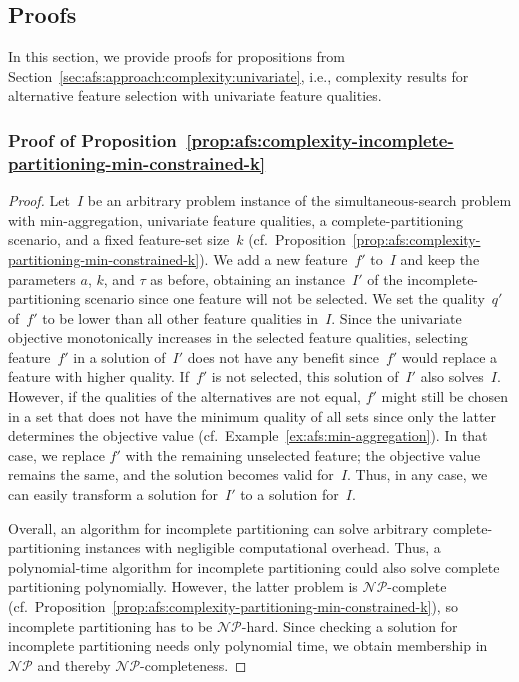 \subsection{Proofs}
\label{sec:appendix:afs:proofs}

In this section, we provide proofs for propositions from Section~\ref{sec:afs:approach:complexity:univariate}, i.e., complexity results for alternative feature selection with univariate feature qualities.

\subsubsection{Proof of Proposition~\ref{prop:afs:complexity-incomplete-partitioning-min-constrained-k}}
\label{sec:appendix:afs:proofs:complexity-incomplete-partitioning-min-constrained-k}

\begin{proof}
	Let~$I$ be an arbitrary problem instance of the simultaneous-search problem with min-aggregation, univariate feature qualities, a complete-partitioning scenario, and a fixed feature-set size~$k$ (cf.~Proposition~\ref{prop:afs:complexity-partitioning-min-constrained-k}).
	We add a new feature~$f'$ to~$I$ and keep the parameters $a$, $k$, and $\tau$ as before, obtaining an instance~$I'$ of the incomplete-partitioning scenario since one feature will not be selected.
	We set the quality~$q'$ of~$f'$ to be lower than all other feature qualities in~$I$.
	Since the univariate objective monotonically increases in the selected feature qualities, selecting feature~$f'$ in a solution of~$I'$ does not have any benefit since~$f'$ would replace a feature with higher quality.
	If~$f'$ is not selected, this solution of~$I'$ also solves~$I$.
	However, if the qualities of the alternatives are not equal, $f'$ might still be chosen in a set that does not have the minimum quality of all sets since only the latter determines the objective value (cf.~Example~\ref{ex:afs:min-aggregation}).
	In that case, we replace $f'$ with the remaining unselected feature; the objective value remains the same, and the solution becomes valid for~$I$.
	Thus, in any case, we can easily transform a solution for~$I'$ to a solution for~$I$.
	
	Overall, an algorithm for incomplete partitioning can solve arbitrary complete-partitioning instances with negligible computational overhead.
	Thus, a polynomial-time algorithm for incomplete partitioning could also solve complete partitioning polynomially.
	However, the latter problem is $\mathcal{NP}$-complete (cf.~Proposition~\ref{prop:afs:complexity-partitioning-min-constrained-k}), so incomplete partitioning has to be $\mathcal{NP}$-hard.
	Since checking a solution for incomplete partitioning needs only polynomial time, we obtain membership in $\mathcal{NP}$ and thereby $\mathcal{NP}$-completeness.
\end{proof}

